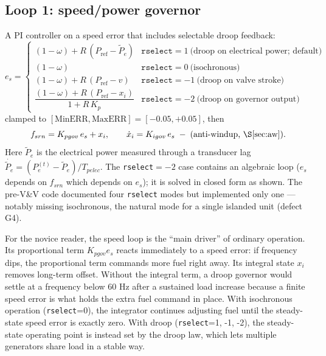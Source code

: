 \documentclass[11pt]{article}
\begin{document}
\subsection{Loop 1: speed/power governor}
\label{sec:ggov1speed}

A PI controller on a speed error that includes selectable droop feedback:
\begin{equation}
  e_s =
  \begin{cases}
    (1-\omega) + R\,(P_\text{ref} - \tilde P_e) & \texttt{rselect}=1
      \ \text{(droop on electrical power; default)}\\[2pt]
    (1-\omega) & \texttt{rselect}=0 \ \text{(isochronous)}\\[2pt]
    (1-\omega) + R\,(P_\text{ref} - v) & \texttt{rselect}=-1
      \ \text{(droop on valve stroke)}\\[2pt]
    \dfrac{(1-\omega) + R\,(P_\text{ref} - x_{i})}{1 + R\,K_{p}} &
      \texttt{rselect}=-2 \ \text{(droop on governor output)}
  \end{cases}
  \label{eq:rselect}
\end{equation}
clamped to $[\text{MinERR}, \text{MaxERR}] = [-0.05, +0.05]$, then
\begin{equation}
  f_{srn} = K_{pgov}\, e_s + x_{i},
  \qquad \dot x_{i} = K_{igov}\,e_s \;-\; \text{(anti-windup, \S\ref{sec:aw})}.
\end{equation}
Here $\tilde P_e$ is the electrical power measured through a transducer
lag $\dot{\tilde P_e} = (P_e^{(t)} - \tilde P_e)/T_{pelec}$. The
\texttt{rselect}$=-2$ case contains an algebraic loop ($e_s$ depends on
$f_{srn}$ which depends on $e_s$); it is solved in closed form as shown.
The pre-V\&V code documented four \texttt{rselect} modes but implemented
only one --- notably missing isochronous, the natural mode for a single
islanded unit (defect G4).

For the novice reader, the speed loop is the ``main driver'' of ordinary
operation. Its proportional term $K_{pgov} e_s$ reacts immediately to a
speed error: if frequency dips, the proportional term commands more fuel
right away. Its integral state $x_i$ removes long-term offset. Without the
integral term, a droop governor would settle at a frequency below 60 Hz
after a sustained load increase because a finite speed error is what holds
the extra fuel command in place. With isochronous operation
(\texttt{rselect}=0), the integrator continues adjusting fuel until the
steady-state speed error is exactly zero. With droop
(\texttt{rselect}=1, -1, -2), the steady-state operating point is instead
set by the droop law, which lets multiple generators share load in a
stable way.
\end{document}
